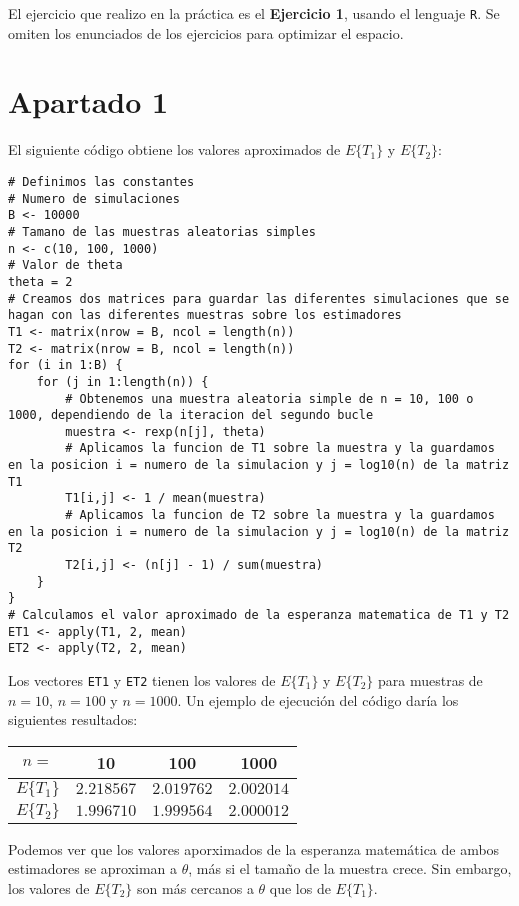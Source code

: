 \documentclass[a4paper,5pt,titlepage]{article}
\begin{document}
	El ejercicio que realizo en la práctica es el \textbf{Ejercicio 1}, usando el lenguaje \texttt{R}. Se omiten los enunciados de los ejercicios para optimizar el espacio.
	\section{Apartado 1}
		El siguiente código obtiene los valores aproximados de $E\{T_1\}$ y $E\{T_2\}$:
		\begin{lstlisting}
# Definimos las constantes
# Numero de simulaciones
B <- 10000
# Tamano de las muestras aleatorias simples
n <- c(10, 100, 1000)
# Valor de theta
theta = 2
# Creamos dos matrices para guardar las diferentes simulaciones que se hagan con las diferentes muestras sobre los estimadores
T1 <- matrix(nrow = B, ncol = length(n))
T2 <- matrix(nrow = B, ncol = length(n))
for (i in 1:B) {
	for (j in 1:length(n)) {
		# Obtenemos una muestra aleatoria simple de n = 10, 100 o 1000, dependiendo de la iteracion del segundo bucle
		muestra <- rexp(n[j], theta)
		# Aplicamos la funcion de T1 sobre la muestra y la guardamos en la posicion i = numero de la simulacion y j = log10(n) de la matriz T1
		T1[i,j] <- 1 / mean(muestra)
		# Aplicamos la funcion de T2 sobre la muestra y la guardamos en la posicion i = numero de la simulacion y j = log10(n) de la matriz T2
		T2[i,j] <- (n[j] - 1) / sum(muestra)
	}
}
# Calculamos el valor aproximado de la esperanza matematica de T1 y T2
ET1 <- apply(T1, 2, mean)
ET2 <- apply(T2, 2, mean)
		\end{lstlisting}
		Los vectores \texttt{ET1} y \texttt{ET2} tienen los valores de $E\{T_1\}$ y $E\{T_2\}$ para muestras de $n=10$, $n=100$ y $n=1000$. Un ejemplo de ejecución del código daría los siguientes resultados:
		\begin{center}
			\begin{tabular}{|c|c|c|c|}
				\hline
				$n=$  & 10 & 100 & 1000 \\
				\hline
				\hline
				$E\{T_1\}$ & $2.218567$ & $2.019762$ & $2.002014$ \\
				\hline
				$E\{T_2\}$ & $1.996710$ & $1.999564$ & $2.000012$ \\
				\hline
			\end{tabular}
		\end{center}
		Podemos ver que los valores aporximados de la esperanza matemática de ambos estimadores se aproximan a $\theta$, más si el tamaño de la muestra crece. Sin embargo, los valores de $E\{T_2\}$ son más cercanos a $\theta$ que los de $E\{T_1\}$.
	\newpage		
\end{document}

